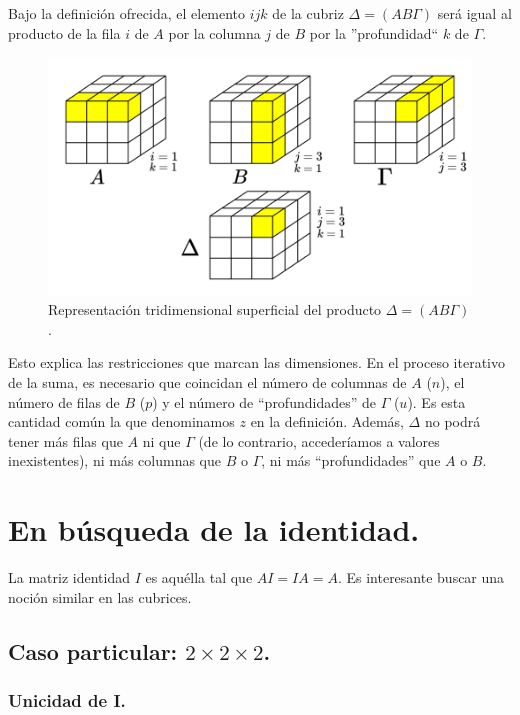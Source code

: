 \documentclass[a4paper, titlepage]{article}
\begin{document}
Bajo la definición ofrecida, el elemento $ijk$ de la cubriz $\Delta = (AB\Gamma)$ será igual al producto de la fila $i$ de $A$ por la columna $j$ de $B$ por la ''profundidad`` $k$ de $\Gamma$.

\begin{figure}[H]
	\includegraphics[width=\linewidth]{product.png}
	\caption{Representación tridimensional superficial del producto $\Delta = (AB\Gamma)$.}
\end{figure}

Esto explica las restricciones que marcan las dimensiones. En el proceso iterativo de la suma, es necesario que coincidan el número de columnas de $A$ ($n$), el número de filas de $B$ ($p$) y el número de ``profundidades'' de $\Gamma$ ($u$). Es esta cantidad común la que denominamos $z$ en la definición. Además, $\Delta$ no podrá tener más filas que $A$ ni que $\Gamma$ (de lo contrario, accederíamos a valores inexistentes), ni más columnas que $B$ o $\Gamma$, ni más ``profundidades'' que $A$ o $B$.

\section{En búsqueda de la identidad.}

La matriz identidad $I$ es aquélla tal que $AI = IA = A$. Es interesante buscar una noción similar en las cubrices.

\subsection{Caso particular: $2\times 2\times 2$.}

\subsubsection{Unicidad de I.}
\end{document}
